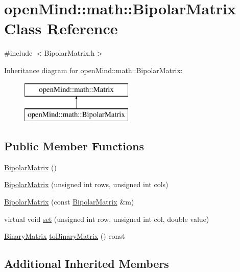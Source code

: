 \hypertarget{classopen_mind_1_1math_1_1_bipolar_matrix}{\section{open\+Mind\+:\+:math\+:\+:Bipolar\+Matrix Class Reference}
\label{classopen_mind_1_1math_1_1_bipolar_matrix}
}


{\ttfamily \#include $<$Bipolar\+Matrix.\+h$>$}

Inheritance diagram for open\+Mind\+:\+:math\+:\+:Bipolar\+Matrix\+:\begin{figure}[H]
\begin{center}
\leavevmode
\includegraphics[height=2.000000cm]{classopen_mind_1_1math_1_1_bipolar_matrix}
\end{center}
\end{figure}
\subsection*{Public Member Functions}
\begin{DoxyCompactItemize}
\item 
\hyperlink{classopen_mind_1_1math_1_1_bipolar_matrix_a753cbf48a1187273e8c1006eabf6af80}{Bipolar\+Matrix} ()
\item 
\hyperlink{classopen_mind_1_1math_1_1_bipolar_matrix_afd72b2ff63797fc1a7acf432b4720fc1}{Bipolar\+Matrix} (unsigned int rows, unsigned int cols)
\item 
\hyperlink{classopen_mind_1_1math_1_1_bipolar_matrix_a035bf4240dcd6c43517649a794bf916f}{Bipolar\+Matrix} (const \hyperlink{classopen_mind_1_1math_1_1_bipolar_matrix}{Bipolar\+Matrix} \&m)
\item 
virtual void \hyperlink{classopen_mind_1_1math_1_1_bipolar_matrix_a1c0f974d78d94f9ddd877b6b15adaed1}{set} (unsigned int row, unsigned int col, double value)
\item 
\hyperlink{classopen_mind_1_1math_1_1_binary_matrix}{Binary\+Matrix} \hyperlink{classopen_mind_1_1math_1_1_bipolar_matrix_aa96ed69f909d7a5b85e54900e7424517}{to\+Binary\+Matrix} () const 
\end{DoxyCompactItemize}
\subsection*{Additional Inherited Members}


